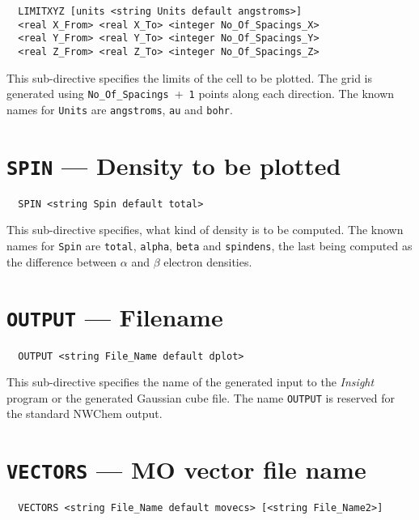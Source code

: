 \begin{verbatim}
  LIMITXYZ [units <string Units default angstroms>]
  <real X_From> <real X_To> <integer No_Of_Spacings_X>
  <real Y_From> <real Y_To> <integer No_Of_Spacings_Y>
  <real Z_From> <real Z_To> <integer No_Of_Spacings_Z>
\end{verbatim}

This sub-directive specifies the limits of the cell to be plotted.
The grid is generated using \verb+No_Of_Spacings+~+~\verb+1+ points
along each direction. The known names for \verb+Units+ are
\verb+angstroms+, \verb+au+ and \verb+bohr+.



\section{{\tt SPIN} --- Density to be plotted}

\begin{verbatim}
  SPIN <string Spin default total>
\end{verbatim}

This sub-directive specifies, what kind of density is to be computed. The 
known names for \verb+Spin+ are \verb+total+, \verb+alpha+, \verb+beta+
and \verb+spindens+, the last being computed as the difference between
$\alpha$ and $\beta$ electron densities.



\section{{\tt OUTPUT} --- Filename}

\begin{verbatim}
  OUTPUT <string File_Name default dplot>
\end{verbatim}

This sub-directive specifies the name of the generated input to the
{\em Insight} program or the generated Gaussian cube file. 
The name \verb+OUTPUT+ is reserved for the
standard NWChem output.



\section{{\tt VECTORS} --- MO vector file name}

\begin{verbatim}
  VECTORS <string File_Name default movecs> [<string File_Name2>]
\end{verbatim}

